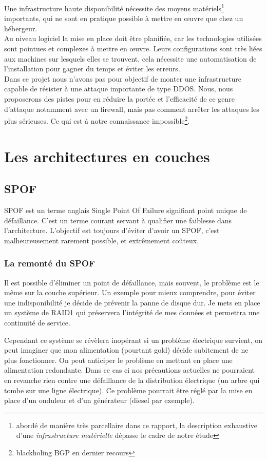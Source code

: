 \documentclass[a4paper,10pt,one side,titlepage]{report}
\begin{document}
Une infrastructure haute disponibilité nécessite des moyens matériels\footnote{abordé de 
manière très parcellaire dans ce rapport, la description exhaustive d'une 
\emph{infrastructure matérielle} dépasse le cadre de notre étude}
importants, qui ne sont en pratique possible à mettre en œuvre que chez un hébergeur.\\ 
Au niveau logiciel la mise en place doit être planifiée, car les technologies 
utilisées sont pointues et complexes à mettre en œuvre. Leurs configurations sont 
très liées aux machines sur lesquels elles se trouvent, cela nécessite une 
automatisation de l'installation pour gagner du temps et éviter les erreurs.\\

Dans ce projet nous n'avons pas pour objectif de monter une infrastructure capable 
de résister à une attaque importante de type \gls{DDOS}. Nous, nous proposerons des 
pistes pour en réduire la portée et l'efficacité de ce genre d'attaque notamment 
avec un \gls{firewall}, mais pas comment arrêter les attaques les plus sérieuses. 
Ce qui est à notre connaissance impossible\footnote{blackholing \gls{BGP} en dernier recours}.

\section{Les architectures en couches}


\subsection{SPOF}
SPOF est un terme anglais Single Point Of Failure signifiant point unique de défaillance.
C'est un terme courant servant à qualifier une faiblesse dans l'architecture.
L'objectif est toujours d'éviter d'avoir un SPOF, c'est malheureusement rarement 
possible, et extrêmement coûteux.

\subsubsection{La remonté du SPOF}
Il est possible d'éliminer un point de défaillance, mais souvent, le problème est le même sur la couche supérieur. Un exemple pour mieux comprendre, pour éviter une indisponibilité je décide de prévenir la panne de disque dur. 
Je mets en place un système de RAID1 qui préservera l'intégrité de mes données et 
permettra une continuité de service. 

Cependant ce système se révèlera inopérant si un problème électrique survient, on
peut imaginer que mon alimentation (pourtant gold) décide subitement de ne plus
fonctionner. On peut anticiper le problème en mettant en place une alimentation 
redondante. Dans ce cas ci nos précautions actuelles ne pourraient en revanche 
rien contre une défaillance de la distribution électrique (un arbre qui tombe sur
une ligne électrique). Ce problème pourrait être réglé par la mise en place d'un 
onduleur et d'un générateur (diesel par exemple). 
\end{document}
